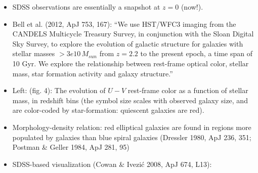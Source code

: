 \documentclass[letterpaper,landscape]{slides}
\begin{document}
\begin{slide}
{\begin{minipage}[t]{15cm}
\begin{itemize}
\item SDSS observations are essentially a snapshot at $z=0$ (now!). 
\item Bell et al. (2012, ApJ 753, 167):  ``We use HST/WFC3 imaging from the CANDELS Multicycle Treasury 
Survey, in conjunction with the Sloan Digital Sky Survey, to explore the evolution of galactic structure for 
galaxies with stellar masses $>3e10 \, M_{sun}$ from $z=2.2$ to the present epoch, a time span of 10 Gyr. 
We explore the relationship between rest-frame optical color, stellar mass, star formation activity and galaxy 
structure.''
\item Left: (fig. 4): The evolution of $U-V$ rest-frame color as a function of stellar mass, 
in redshift bins (the symbol size scales with observed galaxy size, and are color-coded by
star-formation: quiescent galaxies are red). 
\end{itemize}  

\end{minipage}}
\vfill 
\end{slide}


\begin{slide}

\vskip -1.8in
\begin{itemize}
\item
{{\color{red} Morphology-density relation:}} red elliptical galaxies are found in regions more populated by galaxies than
blue spiral galaxies (Dressler 1980, ApJ 236, 351; Postman \& Geller 1984, ApJ 281, 95)
\item
SDSS-based visualization (Cowan \& Ivezi\'{c} 2008, ApJ 674, L13): 
\end{itemize}

\vskip -0.8in
\phantom{x}

\vfill
\end{slide}
 
\end{document}
